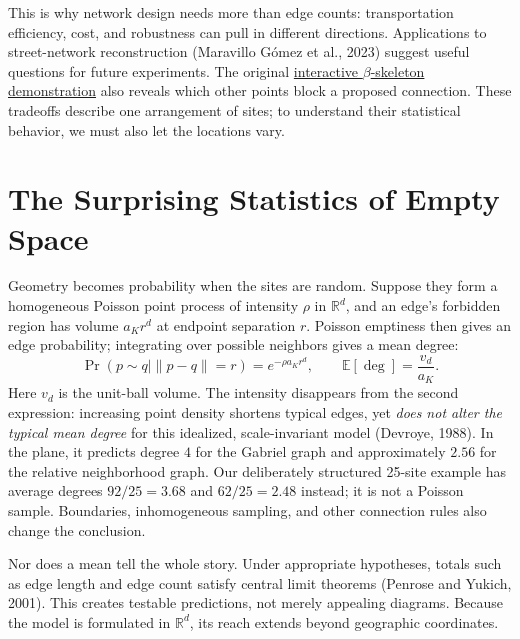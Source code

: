 \documentclass[10pt,letterpaper]{article}
\begin{document}
This is why network design needs more than edge counts: transportation efficiency, cost, and robustness can pull in different directions. Applications to street-network reconstruction (Maravillo G\'omez et al., 2023) suggest useful questions for future experiments. The original \href{https://heri-espino.github.io/proximitygraphs-siam-figures/article.html\#figure3}{interactive $\beta$-skeleton demonstration} also reveals which other points block a proposed connection. These tradeoffs describe one arrangement of sites; to understand their statistical behavior, we must also let the locations vary.

\section*{The Surprising Statistics of Empty Space}

Geometry becomes probability when the sites are random. Suppose they form a homogeneous Poisson point process of intensity $\rho$ in $\mathbb R^d$, and an edge's forbidden region has volume $a_Kr^d$ at endpoint separation $r$. Poisson emptiness then gives an edge probability; integrating over possible neighbors gives a mean degree:
\begin{equation}
\Pr(p\sim q\mid\|p-q\|=r)=e^{-\rho a_Kr^d},\qquad
\mathbb E[\deg]=\frac{v_d}{a_K}.
\label{eq:poisson}
\end{equation}
Here $v_d$ is the unit-ball volume. The intensity disappears from the second expression: increasing point density shortens typical edges, yet \emph{does not alter the typical mean degree} for this idealized, scale-invariant model (Devroye, 1988). In the plane, it predicts degree $4$ for the Gabriel graph and approximately $2.56$ for the relative neighborhood graph. Our deliberately structured 25-site example has average degrees $92/25=3.68$ and $62/25=2.48$ instead; it is not a Poisson sample. Boundaries, inhomogeneous sampling, and other connection rules also change the conclusion.

Nor does a mean tell the whole story. Under appropriate hypotheses, totals such as edge length and edge count satisfy central limit theorems (Penrose and Yukich, 2001). This creates testable predictions, not merely appealing diagrams. Because the model is formulated in $\mathbb R^d$, its reach extends beyond geographic coordinates.
\end{document}
